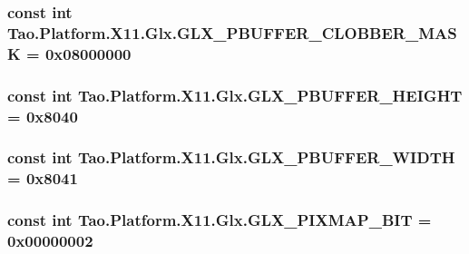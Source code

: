 \label{class_tao_1_1_platform_1_1_x11_1_1_glx_a64b5d49bef52b11f4ad5bd1ef90e84ca}
\hypertarget{class_tao_1_1_platform_1_1_x11_1_1_glx_a8a9f936a285b35c0aa0a3054c135b4cc}{
\subsubsection[{GLX\_\-PBUFFER\_\-CLOBBER\_\-MASK}]{\setlength{\rightskip}{0pt plus 5cm}const int {\bf Tao.Platform.X11.Glx.GLX\_\-PBUFFER\_\-CLOBBER\_\-MASK} = 0x08000000}}
\label{class_tao_1_1_platform_1_1_x11_1_1_glx_a8a9f936a285b35c0aa0a3054c135b4cc}
\hypertarget{class_tao_1_1_platform_1_1_x11_1_1_glx_a2caba72e0d68ed8925433140b69cae1f}{
\subsubsection[{GLX\_\-PBUFFER\_\-HEIGHT}]{\setlength{\rightskip}{0pt plus 5cm}const int {\bf Tao.Platform.X11.Glx.GLX\_\-PBUFFER\_\-HEIGHT} = 0x8040}}
\label{class_tao_1_1_platform_1_1_x11_1_1_glx_a2caba72e0d68ed8925433140b69cae1f}
\hypertarget{class_tao_1_1_platform_1_1_x11_1_1_glx_a3befe7327e4d27a9361056283a741b3a}{
\subsubsection[{GLX\_\-PBUFFER\_\-WIDTH}]{\setlength{\rightskip}{0pt plus 5cm}const int {\bf Tao.Platform.X11.Glx.GLX\_\-PBUFFER\_\-WIDTH} = 0x8041}}
\label{class_tao_1_1_platform_1_1_x11_1_1_glx_a3befe7327e4d27a9361056283a741b3a}
\hypertarget{class_tao_1_1_platform_1_1_x11_1_1_glx_abb8f9b7e88bfa3589924a83107ba014d}{
\subsubsection[{GLX\_\-PIXMAP\_\-BIT}]{\setlength{\rightskip}{0pt plus 5cm}const int {\bf Tao.Platform.X11.Glx.GLX\_\-PIXMAP\_\-BIT} = 0x00000002}}
